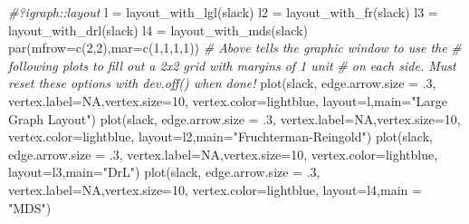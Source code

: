 \documentclass[
]{article}
\newenvironment{Shaded}{\begin{snugshade}}{\end{snugshade}}
\newcommand{\AttributeTok}[1]{\textcolor[rgb]{0.77,0.63,0.00}{#1}}
\newcommand{\CommentTok}[1]{\textcolor[rgb]{0.56,0.35,0.01}{\textit{#1}}}
\newcommand{\ConstantTok}[1]{\textcolor[rgb]{0.00,0.00,0.00}{#1}}
\newcommand{\DecValTok}[1]{\textcolor[rgb]{0.00,0.00,0.81}{#1}}
\newcommand{\FunctionTok}[1]{\textcolor[rgb]{0.00,0.00,0.00}{#1}}
\newcommand{\NormalTok}[1]{#1}
\newcommand{\OtherTok}[1]{\textcolor[rgb]{0.56,0.35,0.01}{#1}}
\newcommand{\StringTok}[1]{\textcolor[rgb]{0.31,0.60,0.02}{#1}}
\theoremstyle{definition}
\theoremstyle{definition}
\theoremstyle{definition}
\theoremstyle{definition}
\theoremstyle{remark}
\begin{document}
\begin{Shaded}
\begin{Highlighting}[]
\CommentTok{\#?igraph::layout}
\NormalTok{l }\OtherTok{=} \FunctionTok{layout\_with\_lgl}\NormalTok{(slack)}
\NormalTok{l2 }\OtherTok{=} \FunctionTok{layout\_with\_fr}\NormalTok{(slack)}
\NormalTok{l3 }\OtherTok{=} \FunctionTok{layout\_with\_drl}\NormalTok{(slack)}
\NormalTok{l4 }\OtherTok{=}  \FunctionTok{layout\_with\_mds}\NormalTok{(slack)}
\FunctionTok{par}\NormalTok{(}\AttributeTok{mfrow=}\FunctionTok{c}\NormalTok{(}\DecValTok{2}\NormalTok{,}\DecValTok{2}\NormalTok{),}\AttributeTok{mar=}\FunctionTok{c}\NormalTok{(}\DecValTok{1}\NormalTok{,}\DecValTok{1}\NormalTok{,}\DecValTok{1}\NormalTok{,}\DecValTok{1}\NormalTok{)) }
\CommentTok{\# Above tells the graphic window to use the}
\CommentTok{\# following plots to fill out a 2x2 grid with margins of 1 unit}
\CommentTok{\# on each side. Must reset these options with dev.off() when done!}
\FunctionTok{plot}\NormalTok{(slack, }\AttributeTok{edge.arrow.size =}\NormalTok{ .}\DecValTok{3}\NormalTok{, }\AttributeTok{vertex.label=}\ConstantTok{NA}\NormalTok{,}\AttributeTok{vertex.size=}\DecValTok{10}\NormalTok{,}
     \AttributeTok{vertex.color=}\StringTok{\textquotesingle{}lightblue\textquotesingle{}}\NormalTok{, }\AttributeTok{layout=}\NormalTok{l,}\AttributeTok{main=}\StringTok{"Large Graph Layout"}\NormalTok{)}
\FunctionTok{plot}\NormalTok{(slack, }\AttributeTok{edge.arrow.size =}\NormalTok{ .}\DecValTok{3}\NormalTok{, }\AttributeTok{vertex.label=}\ConstantTok{NA}\NormalTok{,}\AttributeTok{vertex.size=}\DecValTok{10}\NormalTok{,}
     \AttributeTok{vertex.color=}\StringTok{\textquotesingle{}lightblue\textquotesingle{}}\NormalTok{, }\AttributeTok{layout=}\NormalTok{l2,}\AttributeTok{main=}\StringTok{"Fruchterman{-}Reingold"}\NormalTok{)}
\FunctionTok{plot}\NormalTok{(slack, }\AttributeTok{edge.arrow.size =}\NormalTok{ .}\DecValTok{3}\NormalTok{, }\AttributeTok{vertex.label=}\ConstantTok{NA}\NormalTok{,}\AttributeTok{vertex.size=}\DecValTok{10}\NormalTok{,}
     \AttributeTok{vertex.color=}\StringTok{\textquotesingle{}lightblue\textquotesingle{}}\NormalTok{, }\AttributeTok{layout=}\NormalTok{l3,}\AttributeTok{main=}\StringTok{"DrL"}\NormalTok{)}
\FunctionTok{plot}\NormalTok{(slack, }\AttributeTok{edge.arrow.size =}\NormalTok{ .}\DecValTok{3}\NormalTok{, }\AttributeTok{vertex.label=}\ConstantTok{NA}\NormalTok{,}\AttributeTok{vertex.size=}\DecValTok{10}\NormalTok{,}
     \AttributeTok{vertex.color=}\StringTok{\textquotesingle{}lightblue\textquotesingle{}}\NormalTok{, }\AttributeTok{layout=}\NormalTok{l4,}\AttributeTok{main =} \StringTok{"MDS"}\NormalTok{)}
\end{Highlighting}
\end{Shaded}
\end{document}
